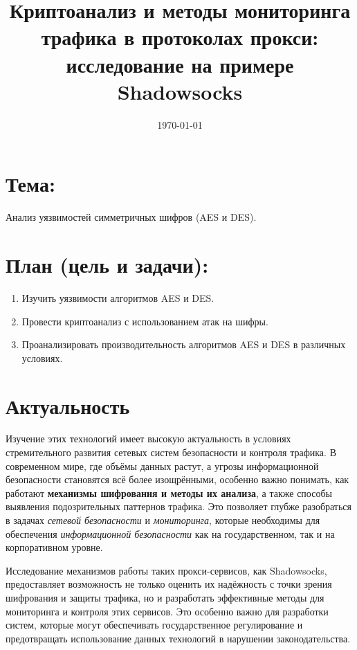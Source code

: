 \documentclass[a4paper,12pt]{article}
\begin{document}
\title{Криптоанализ и методы мониторинга трафика в протоколах прокси: исследование на примере Shadowsocks}
\date{\today}
\maketitle

\section*{Тема:}

Анализ уязвимостей симметричных шифров (AES и DES).

\section*{План (цель и задачи):}

\begin{enumerate}
    \item Изучить уязвимости алгоритмов AES и DES.
    \item Провести криптоанализ с использованием атак на шифры.
    \item Проанализировать производительность алгоритмов AES и DES в различных условиях.
\end{enumerate}


\section*{Актуальность}

Изучение этих технологий имеет высокую актуальность в условиях стремительного развития сетевых систем безопасности и контроля трафика. В современном мире, где объёмы данных растут, а угрозы информационной безопасности становятся всё более изощрёнными, особенно важно понимать, как работают \textbf{механизмы шифрования и методы их анализа}, а также способы выявления подозрительных паттернов трафика. Это позволяет глубже разобраться в задачах \textit{сетевой безопасности} и \textit{мониторинга}, которые необходимы для обеспечения \textit{информационной безопасности} как на государственном, так и на корпоративном уровне.

Исследование механизмов работы таких прокси-сервисов, как Shadowsocks, предоставляет возможность не только оценить их надёжность с точки зрения шифрования и защиты трафика, но и разработать эффективные методы для мониторинга и контроля этих сервисов. Это особенно важно для разработки систем, которые могут обеспечивать государственное регулирование и предотвращать использование данных технологий в нарушении законодательства.
\end{document}
